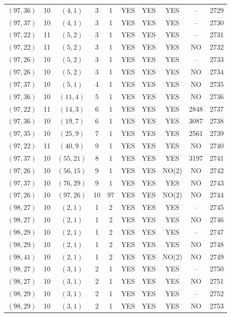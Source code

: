 \begin{longtable}{|c|c|c|c|c|c|c|c|c|c|}
$(97, 36)$ & 10 & $(4, 1)$ & 3 & 1 & YES & YES & YES & -- & 2729\\
$(97, 37)$ & 10 & $(4, 1)$ & 3 & 1 & YES & YES & YES & -- & 2730\\
$(97, 22)$ & 11 & $(5, 2)$ & 3 & 1 & YES & YES & YES & -- & 2731\\
$(97, 22)$ & 11 & $(5, 2)$ & 3 & 1 & YES & YES & YES & NO & 2732\\
$(97, 26)$ & 10 & $(5, 2)$ & 3 & 1 & YES & YES & YES & -- & 2733\\
$(97, 26)$ & 10 & $(5, 2)$ & 3 & 1 & YES & YES & YES & NO & 2734\\
$(97, 37)$ & 10 & $(5, 1)$ & 4 & 1 & YES & YES & YES & NO & 2735\\
$(97, 36)$ & 10 & $(11, 4)$ & 5 & 1 & YES & YES & YES & NO & 2736\\
$(97, 22)$ & 11 & $(14, 3)$ & 6 & 1 & YES & YES & YES & 2848 & 2737\\
$(97, 36)$ & 10 & $(19, 7)$ & 6 & 1 & YES & YES & YES & 3087 & 2738\\
$(97, 35)$ & 10 & $(25, 9)$ & 7 & 1 & YES & YES & YES & 2561 & 2739\\
$(97, 22)$ & 11 & $(40, 9)$ & 9 & 1 & YES & YES & YES & NO & 2740\\
$(97, 37)$ & 10 & $(55, 21)$ & 8 & 1 & YES & YES & YES & 3197 & 2741\\
$(97, 26)$ & 10 & $(56, 15)$ & 9 & 1 & YES & YES & NO(2) & NO & 2742\\
$(97, 37)$ & 10 & $(76, 29)$ & 9 & 1 & YES & YES & YES & NO & 2743\\
$(97, 26)$ & 10 & $(97, 26)$ & 10 & 97 & YES & YES & NO(2) & NO & 2744\\
$(98, 27)$ & 10 & $(2, 1)$ & 1 & 2 & YES & YES & YES & -- & 2745\\
$(98, 27)$ & 10 & $(2, 1)$ & 1 & 2 & YES & YES & YES & NO & 2746\\
$(98, 29)$ & 10 & $(2, 1)$ & 1 & 2 & YES & YES & YES & -- & 2747\\
$(98, 29)$ & 10 & $(2, 1)$ & 1 & 2 & YES & YES & YES & NO & 2748\\
$(98, 41)$ & 10 & $(2, 1)$ & 1 & 2 & YES & YES & NO(2) & NO & 2749\\
$(98, 27)$ & 10 & $(3, 1)$ & 2 & 1 & YES & YES & YES & -- & 2750\\
$(98, 27)$ & 10 & $(3, 1)$ & 2 & 1 & YES & YES & YES & NO & 2751\\
$(98, 29)$ & 10 & $(3, 1)$ & 2 & 1 & YES & YES & YES & -- & 2752\\
$(98, 29)$ & 10 & $(3, 1)$ & 2 & 1 & YES & YES & YES & NO & 2753\\

\end{longtable}
